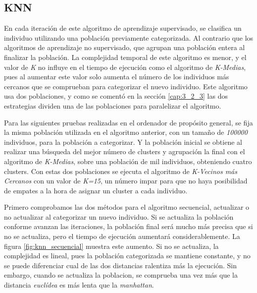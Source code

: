 	\subsection{KNN}


		En cada iteración de este algoritmo de aprendizaje supervisado, se clasifica un individuo utilizando una población previamente categorizada. Al contrario que los algoritmos de aprendizaje no supervisado, que agrupan una población entera al finalizar la población. La complejidad temporal de este algoritmo es menor, y el valor de \textit{K} no influye en el tiempo de ejecución como el algoritmo de \textit{K-Medias}, pues al aumentar este valor solo aumenta el número de los individuos más cercanos que se comprueban para categorizar el nuevo individuo. Este algoritmo usa dos poblaciones, y como se comentó en la sección \ref{cap:3_2_3} las dos estrategias dividen una de las poblaciones para paralelizar el algoritmo. 
		
			Para las siguientes pruebas realizadas en el ordenador de propósito general, se fija la misma población utilizada en el algoritmo anterior, con un tamaño de \textit{100000} individuos, para la población a categorizar. Y la población inicial se obtiene al realizar una búsqueda del mejor número de clusters y agrupación la final con el algoritmo de \textit{K-Medias}, sobre una población de mil individuos, obteniendo cuatro clusters. Con estas dos poblaciones se ejecuta el algoritmo de \textit{K-Vecinos más Cercanos} con un valor de \textit{K=15}, un número impar para que no haya posibilidad de empates a la hora de asignar un cluster a cada individuo.
			
		
			Primero comprobamos las dos métodos para el algoritmo secuencial, actualizar o no actualizar al categorizar un nuevo individuo. Si se actualiza la población conforme avanzan las iteraciones, la población final será mucho más precisa que si no se actualiza, pero el tiempo de ejecución aumentará considerablemente. La figura \ref{fig:knn_secuencial} muestra este aumento. Si no se actualiza, la complejidad es lineal, pues la población categorizada se mantiene constante, y no se puede diferenciar cual de las dos distancias ralentiza más la ejecución. Sin embargo, cuando se actualiza la poblacion, se comprueba una vez más que la distancia \textit{euclídea} es más lenta que la \textit{manhattan}.
			
